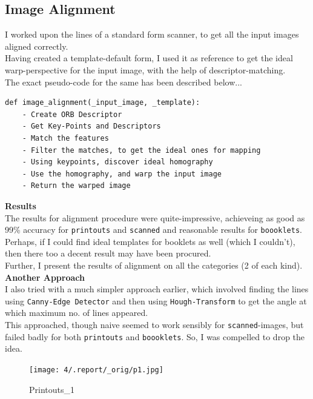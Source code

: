 \documentclass{article}
\begin{document}
    \subsection*{Image Alignment}
    I worked upon the lines of a standard form scanner, to get all the input images aligned correctly.\\
    Having created a template-default form, I used it as reference to get the ideal warp-perspective for the input image, with the help of descriptor-matching.\\
    The exact pseudo-code for the same has been described below...\\
    \begin{lstlisting}
def image_alignment(_input_image, _template):
    - Create ORB Descriptor
    - Get Key-Points and Descriptors
    - Match the features
    - Filter the matches, to get the ideal ones for mapping
    - Using keypoints, discover ideal homography
    - Use the homography, and warp the input image
    - Return the warped image
    \end{lstlisting}
\textbf{Results}\\
    The results for alignment procedure were quite-impressive, achieveing as good as 99\% accuracy for \texttt{printouts} and \texttt{scanned} and reasonable results for \texttt{boooklets}. Perhaps, if I could find ideal templates for booklets as well (which I couldn't), then there too a decent result may have been procured.\\
    Further, I present the results of alignment on all the categories (2 of each kind).\\
\textbf{Another Approach}\\
    I also tried with a much simpler approach earlier, which involved finding the lines using \texttt{Canny-Edge Detector} and then using \texttt{Hough-Transform} to get the angle at which maximum no. of lines appeared.\\ This approached, though naive seemed to work sensibly for \texttt{scanned}-images, but failed badly for both \texttt{printouts} and \texttt{boooklets}. So, I was compelled to drop the idea.
\pagebreak
    \begin{figure}[!htb]
    \minipage{\textwidth}
    \begin{center}
      \texttt{[image: 4/.report/\_orig/p1.jpg]}
      \caption{Printouts_1}
    \end{center}
    \endminipage
    \end{figure}
\end{document}
